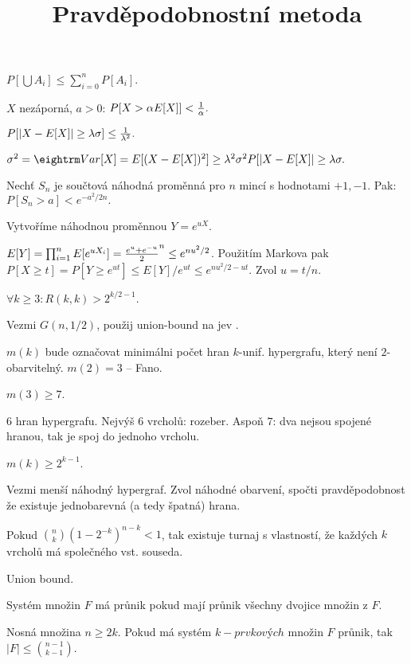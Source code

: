 

\title{Pravděpodobnostní metoda}


$P[\bigcup A_i] \le \sum_{i=0}^n P[A_i].$

 $X$ nezáporná, $a > 0$:
$P[X > \alpha E[X]] < {1 \over \alpha}.$

$P[|X-E[X]| \ge \lambda\sigma] \le {1 \over \lambda^2}.$

\prf{}
$\sigma^2 = \var[X] = E[(X - E[X])^2] \ge \lambda^2 \sigma^2 P[|X-E[X]| \ge \lambda\sigma. $

 Nechť $S_n$ je součtová náhodná proměnná pro $n$ mincí s hodnotami ${+1,-1}$. Pak:
$P[S_n > a] < e^{-a^2 / 2n}.$

\prf{} Vytvoříme náhodnou proměnnou $Y = e^{uX}$.

$E[Y] = \prod_{i=1}^n E[e^{uX_i}] = {e^u + e^{-u} \over 2}^n \le e^{nu^2/2}$. Použitím Markova pak
$P[X \ge t] = P[Y \ge e^{ut}] \le E[Y] / e^{ut} \le e^{nu^2/2 - ut}$. Zvol $u =
t/n$.


 $\forall k \ge 3: R(k,k) > 2^{k/2 - 1}$.

\prf{} Vezmi $G(n,1/2)$, použij union-bound na jev .

\dfn{}$m(k)$ bude označovat minimálni počet hran $k$-unif. hypergrafu, který není
$2$-obarvitelný. $m(2) = 3$ -- Fano.

\obs{} $m(3) \ge 7$.

\prf{} $6$ hran hypergrafu. Nejvýš $6$ vrcholů: rozeber. Aspoň $7$: dva nejsou
spojené hranou, tak je spoj do jednoho vrcholu.

 $m(k) \ge 2^{k-1}$.

\prf{} Vezmi menší náhodný hypergraf. Zvol náhodné obarvení, spočti
pravděpodobnost že existuje jednobarevná (a tedy špatná) hrana.

\thm{} Pokud ${n \choose k} (1 - 2^{-k})^{n-k} <1$, tak existuje turnaj
s vlastností, že každých $k$ vrcholů má společného vst. souseda.

\prf{} Union bound.


\dfn{} Systém množin $F$ {\I má průnik} pokud mají průnik všechny dvojice množin z $F$.

 Nosná množina $n \ge 2k$. Pokud má systém
$k-prvkových$ množin $F$ průnik, tak $|F| \le {n-1 \choose k-1}$.

